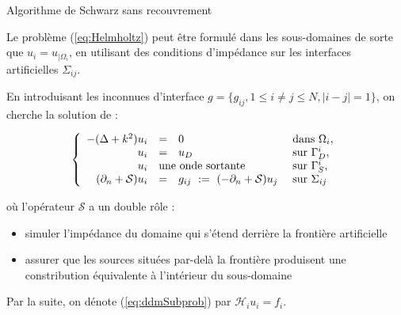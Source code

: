 \documentclass[
mode=present,    %
paper=a4paper,   %
orient=landscape,
display=slides,   %
size=10pt,
style=romain   %
]{powerdot}
\begin{document}
\begin{slide}[toc=Algorithme]{Algorithme de Schwarz sans recouvrement}

Le problème  (\ref{eq:Helmholtz}) peut être formulé dans les sous-domaines
de sorte que $u_i=u_{|\Omega_i}$, en utilisant des conditions d'impédance
sur les interfaces artificielles $\Sigma_{ij}$. 

\bigskip
En introduisant les inconnues d'interface $g = \{g_{ij}, 1 \leq i \neq j
\leq N, |i-j| = 1\}$, on cherche la solution de :

\begin{equation}
\left\{\begin{array}{rcll}
-(\Delta + k^2) u_i & = & 0 & \text{ dans } \Omega_i,\\
u_i & = & u_D & \text{ sur } \Gamma_D^i,\\
u_i & \multicolumn{2}{l}{\text{une onde sortante}} & \text{ sur } \Gamma_S^i,\\
(\partial_n + \mathcal{S}) u_i & = & g_{ij} \ :=\  (- \partial_n + \mathcal{S}) u_j   & \text{ sur } \Sigma_{ij}
\end{array}\right.
\label{eq:ddmSubprob}
\end{equation}

\smallskip
où l'opérateur $\mathcal{S}$ a un double rôle :
\begin{itemize}
\item 
simuler l'impédance du domaine qui s'étend derrière la frontière artificielle
\item assurer que les sources situées par-delà la frontière produisent une
  constribution équivalente à l'intérieur du sous-domaine
\end{itemize}

Par la suite, on dénote (\ref{eq:ddmSubprob}) par $\mathcal{H}_{i}u_{i}=f_{i}$.

\end{slide}
\end{document}
